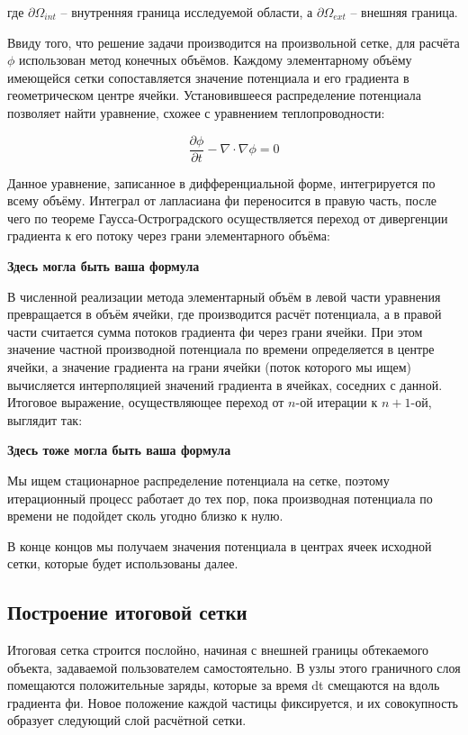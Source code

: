 \documentclass[a4paper,12pt]{article}
\begin{document}
\noindent
где $\partial \Omega_{int}$ -- внутренняя граница исследуемой области, а $\partial \Omega_{ext}$ -- внешняя граница.

Ввиду того, что решение задачи производится на произвольной сетке, для расчёта $\phi$ использован метод конечных объёмов. Каждому элементарному объёму имеющейся сетки сопоставляется значение потенциала и его градиента в геометрическом центре ячейки. Установившееся распределение потенциала позволяет найти уравнение, схожее с уравнением теплопроводности:

\begin{equation}
    \frac{\partial \phi}{\partial t} - \nabla \cdot \nabla \phi = 0
\end{equation}

Данное уравнение, записанное в дифференциальной форме, интегрируется по всему объёму. Интеграл от лапласиана фи переносится в правую часть, после чего по теореме Гаусса-Остроградского осуществляется переход от дивергенции градиента к его потоку через грани элементарного объёма:

\textbf{Здесь могла быть ваша формула}

В численной реализации метода элементарный объём в левой части уравнения превращается в объём ячейки, где производится расчёт потенциала, а в правой части считается сумма потоков градиента фи через грани ячейки. При этом значение частной производной потенциала по времени определяется в центре ячейки, а значение градиента на грани ячейки (поток которого мы ищем) вычисляется интерполяцией значений градиента в ячейках, соседних с данной.
Итоговое выражение, осуществляющее переход от $n$-ой итерации к $n+1$-ой, выглядит так:

\textbf{Здесь тоже могла быть ваша формула}

Мы ищем стационарное распределение потенциала на сетке, поэтому итерационный процесс работает до тех пор, пока производная потенциала по времени не подойдет сколь угодно близко к нулю.

В конце концов мы получаем значения потенциала в центрах ячеек исходной сетки, которые будет использованы далее.

\subsection{Построение итоговой сетки}

Итоговая сетка строится послойно, начиная с внешней границы обтекаемого объекта, задаваемой пользователем самостоятельно. В узлы этого граничного слоя помещаются положительные заряды, которые за время dt смещаются на вдоль градиента фи. Новое положение каждой частицы фиксируется, и их совокупность образует следующий слой расчётной сетки.
\end{document}

